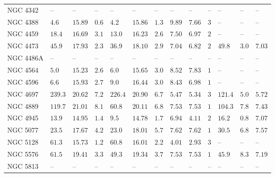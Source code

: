 \begin{table*}
\begin{center}
\begin{tabular}{lllllllllllll}
NGC 4342  \quad &   -- &   -- &   -- \quad \quad &   -- &   -- &   -- &   -- &   -- \quad \quad & 
 -- \quad \quad & 
 -- &   -- &   --    \\ 
NGC 4388  \quad &  $4.6$  &  $15.89$  &  $0.6$  \quad \quad &  $4.2$  &  $15.86$  &  $1.3$  &  $9.89$  &  $7.66$  \quad \quad &  $3$  \quad \quad &   -- &   -- &   --    \\ 
NGC 4459  \quad &  $18.4$  &  $16.69$  &  $3.1$  \quad \quad &  $13.0$  &  $16.23$  &  $2.6$  &  $7.50$  &  $6.97$  \quad \quad &  $2$  \quad \quad &   -- &   -- &   --    \\ 
NGC 4473  \quad &  $45.9$  &  $17.93$  &  $2.3$  \quad \quad &  $36.9$  &  $18.10$  &  $2.9$  &  $7.04$  &  $6.82$  \quad \quad &  $2$  \quad \quad &  $49.8$  &  $3.0$  &  $7.03$  \\ 
NGC 4486A  \quad &   -- &   -- &   -- \quad \quad &   -- &   -- &   -- &   -- &   -- \quad \quad & 
 -- \quad \quad & 
 -- &   -- &   --    \\ 
NGC 4564  \quad &  $5.0$  &  $15.23$  &  $2.6$  \quad \quad &  $6.0$  &  $15.65$  &  $3.0$  &  $8.52$  &  $7.83$  \quad \quad &  $1$  \quad \quad &   -- &   -- &   --    \\ 
NGC 4596  \quad &  $6.6$  &  $15.93$  &  $2.7$  \quad \quad &  $9.0$  &  $16.44$  &  $3.0$  &  $8.43$  &  $6.98$  \quad \quad &  $1$  \quad \quad &   -- &   -- &   --    \\ 
NGC 4697  \quad &  $239.3$  &  $20.62$  &  $7.2$  \quad \quad &  $226.4$  &  $20.90$  &  $6.7$  &  $5.47$  &  $5.34$  \quad \quad &  $3$  \quad \quad &  $121.4$  &  $5.0$  &  $5.72$  \\ 
NGC 4889  \quad &  $119.7$  &  $21.01$  &  $8.1$  \quad \quad &  $60.8$  &  $20.11$  &  $6.8$  &  $7.53$  &  $7.53$  \quad \quad &  $1$  \quad \quad &  $104.3$  &  $7.8$  &  $7.43$  \\ 
NGC 4945  \quad &  $13.9$  &  $14.95$  &  $1.4$  \quad \quad &  $9.5$  &  $14.78$  &  $1.7$  &  $6.94$  &  $4.11$  \quad \quad &  $2$  \quad \quad &  $16.2$  &  $0.8$  &  $7.07$  \\ 
NGC 5077  \quad &  $23.5$  &  $17.67$  &  $4.2$  \quad \quad &  $23.0$  &  $18.01$  &  $5.7$  &  $7.62$  &  $7.62$  \quad \quad &  $1$  \quad \quad &  $30.5$  &  $6.8$  &  $7.57$  \\ 
NGC 5128  \quad &  $61.3$  &  $15.73$  &  $1.2$  \quad \quad &  $60.8$  &  $16.01$  &  $2.2$  &  $4.01$  &  $2.93$  \quad \quad &  $3$  \quad \quad &   -- &   -- &   --    \\ 
NGC 5576  \quad &  $61.5$  &  $19.41$  &  $3.3$  \quad \quad &  $49.3$  &  $19.34$  &  $3.7$  &  $7.53$  &  $7.53$  \quad \quad &  $1$  \quad \quad &  $45.9$  &  $8.3$  &  $7.19$  \\ 
NGC 5813  \quad &   -- &   -- &   -- \quad \quad &   -- &   -- &   -- &   -- &   -- \quad \quad & 
 -- \quad \quad & 
 -- &   -- &   --    \\ 
\hline         
\end{tabular}   
\label{tab:fitres} 
\end{center}    
\end{table*}    

